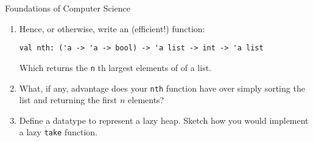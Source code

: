 \documentclass{tripos}  %
\begin{document}
\begin{question}[MockIA,year=2024,paper=1,question=4,author=rrw]{Foundations of Computer Science}
\begin{enumerate}
\item Hence, or otherwise, write an (efficient!) function:

\begin{verbatim}
val nth: ('a -> 'a -> bool) -> 'a list -> int -> 'a list
\end{verbatim}

Which returns the \verb|n| th largest elements of of a list.

\item What, if any, advantage does your \verb|nth| function have over simply sorting the list and returning the first $n$ elements?
\item Define a datatype to represent a lazy heap. Sketch how you would implement a lazy \verb|take| function.
\end{enumerate}

\end{question}
\end{document}
